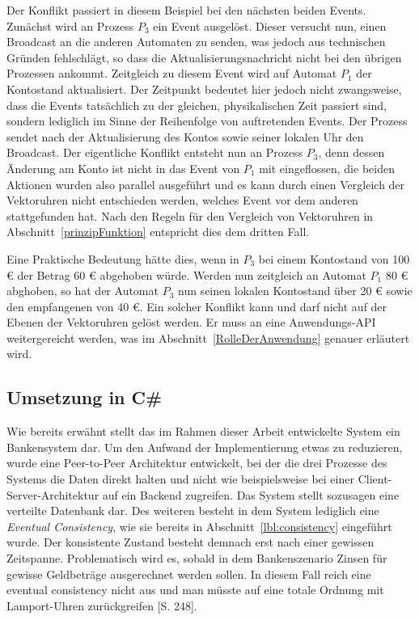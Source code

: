 Der Konflikt passiert in diesem Beispiel bei den nächsten beiden Events. Zunächst wird an Prozess $P_3$ ein Event ausgelöst. Dieser versucht nun, einen Broadcast an die anderen Automaten zu senden, was jedoch aus technischen Gründen fehlschlägt, so dass die Aktualisierungsnachricht nicht bei den übrigen Prozessen ankommt. Zeitgleich zu diesem Event wird auf Automat $P_1$ der Kontostand aktualisiert. Der Zeitpunkt  bedeutet hier jedoch nicht zwangsweise, dass die Events tatsächlich zu der gleichen, physikalischen Zeit passiert sind, sondern lediglich im Sinne der Reihenfolge von auftretenden Events. Der Prozess sendet nach der Aktualisierung des Kontos sowie seiner lokalen Uhr den Broadcast. Der eigentliche Konflikt entsteht nun an Prozess $P_3$, denn dessen Änderung am Konto ist nicht in das Event von $P_1$ mit eingeflossen, die beiden Aktionen wurden also parallel ausgeführt und es kann durch einen Vergleich der Vektoruhren nicht entschieden werden, welches Event vor dem anderen stattgefunden hat. Nach den Regeln für den Vergleich von Vektoruhren in Abschnitt~\ref{prinzipFunktion} entspricht dies dem dritten Fall.

Eine Praktische Bedeutung hätte dies, wenn in $P_3$ bei einem Kontostand von 100 \euro{} der Betrag 60 \euro{} abgehoben würde. Werden nun zeitgleich an Automat $P_1$ 80 \euro{} abghoben, so hat der Automat $P_3$ nun seinen lokalen Kontostand über 20 \euro{} sowie den empfangenen von 40 \euro{}. Ein solcher Konflikt kann und darf nicht auf der Ebenen der Vektoruhren gelöst werden. Er muss an eine Anwendungs-API weitergereicht werden, was im Abschnitt~\ref{RolleDerAnwendung} genauer erläutert wird.  

\subsection{Umsetzung in C\#}
\label{vectorClockImpl}
Wie bereits erwähnt stellt das im Rahmen dieser Arbeit entwickelte System ein Bankensystem dar. Um den Aufwand der Implementierung etwas zu reduzieren, wurde eine Peer-to-Peer Architektur entwickelt, bei der die drei Prozesse des Systems die Daten direkt halten und nicht wie beispielsweise bei einer Client-Server-Architektur auf ein Backend zugreifen. Das System stellt sozusagen eine verteilte Datenbank dar.
Des weiteren besteht in dem System lediglich eine \textit{Eventual Consistency}, wie sie bereits in Abschnitt~\ref{lbl:consistency} eingeführt wurde. Der konsistente Zustand besteht demnach erst nach einer gewissen Zeitspanne. Problematisch wird es, sobald in dem Bankenszenario Zinsen für gewisse Geldbeträge ausgerechnet werden sollen. In diesem Fall reich eine eventual consistency nicht aus und man müsste auf eine totale Ordnung mit Lamport-Uhren zurückgreifen \cite{Tanenbaum2007}[S. 248].

